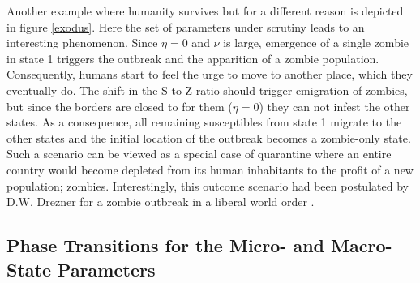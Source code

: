 \documentclass[11pt]{article} %
\begin{document}
Another example where humanity survives but for a different reason is depicted in figure \ref{exodus}.
Here the set of parameters under scrutiny leads to an interesting phenomenon. Since $\eta=0$ and $\nu$ is large, emergence of a single zombie in state 1 triggers the outbreak and the apparition of a zombie population. Consequently, humans start to feel the urge to move to another place, which they eventually do. The shift in the S to Z ratio should trigger emigration of zombies, but since the borders are closed to for them ($\eta=0$) they can not infest the other states. As a consequence, all remaining susceptibles from state 1 migrate to the other states and the initial location of the outbreak becomes a zombie-only state. Such a scenario can be viewed as a special case of quarantine where an entire country would become depleted from its human inhabitants to the profit of a new population; zombies. Interestingly, this outcome scenario had been postulated by D.W. Drezner for a zombie outbreak in a liberal world order \cite{drezner}. 

\subsection{Phase Transitions for the Micro- and Macro-State Parameters}\indent
\end{document}
